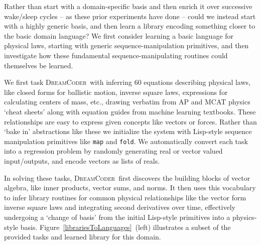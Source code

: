 \documentclass{article}
\newcommand{\system}{\textsc{DreamCoder}~}
\newcommand{\code}[1]{{\footnotesize\texttt{#1}}}
\begin{document}
Rather than start with a domain-specific basis and then enrich it over successive wake/sleep cycles -- as these prior experiments have done --
could we instead start with a highly generic basis,
and then learn a library encoding something closer to the basic domain language?
We first consider learning a basic language for physical laws,
starting with generic sequence-manipulation primitives,
and then investigate how these fundamental sequence-manipulating routines could themselves be learned.

We first task \system with inferring 60 equations describing physical laws,
like closed forms for ballistic motion, inverse square laws,
expressions for calculating centers of mass, etc.,
drawing verbatim from AP and MCAT physics `cheat sheets'
along with equation guides from machine learning textbooks.
These relationships are easy to express
given concepts like vectors or forces.
Rather than `bake in' abstractions like these we
initialize the system with Lisp-style sequence manipulation primitives like
\code{map} and \code{fold}.
We automatically convert each task into a
regression problem by randomly generating real or vector valued input/outputs,
and encode vectors as lists of reals.

In solving these tasks, \system first discovers the building blocks of vector algebra,
like inner products, vector sums, and norms.
It then uses this vocabulary to infer library routines for common
physical relationships like the vector form inverse square laws
and integrating second derivatives over time,
effectively undergoing a `change of basis' from the initial Lisp-style primitives into a
physics-style basis. Figure~\ref{librariesToLanguages}~(left) illustrates a subset
of the provided tasks and learned library for this domain. 
\end{document}
